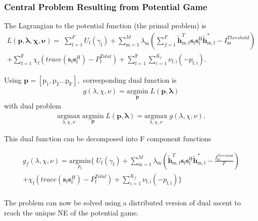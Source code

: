 \documentclass[12pt,a4paper]{report}
\begin{document}
\subsubsection{Central Problem Resulting from Potential Game}
The Lagrangian to the potential function (the primal problem) is
\begin{multline}
L(\mathbf{\mathbf{p},\lambda,\chi,\nu}) = 
\;
\sum_{\text{f}=1}^F U_{\text{f}}(\gamma_{\text{f}}) 
+
\sum_{\mathrm{m=1}}^M \lambda_{\mathrm{m}}
(	  \sum^F_{f=1} \mathbf{\tilde{h}}_{\mathrm{m,f}}^T  \mathbf{s}_{\mathrm{f}} 						
	\mathbf{s_{\mathrm{f}}^{\mathrm{H}}} \mathbf{\tilde{h}_{\mathrm{m,f}}^*} - I^{Threshold}		
	_{\mathrm{m}} )
\\
+ 
\sum_{\text{f}=1}^\text{F}
\chi_{\mathrm{f}}(trace(\mathbf{s}_\mathrm{f}\mathbf{s}_\mathrm{f}^H)-P^{Total}_{\text{f}} )
+
\sum_{\text{f}=1}^\text{F}
\sum_{i=1}^{K_{\text{f}}}
\nu_{\mathrm{f,i}}(-p_{\mathrm{f,i}}).
\end{multline}

Using $\mathbf{p}= [\mathrm{p}_1, \mathrm{p}_2...\mathrm{p}_{\text{F}}],$ corresponding dual function is
\begin{gather*}
g(\lambda, \chi, \nu) = \underset{\mathbf{p}}{\mathrm{argmin}}\;L(\mathbf{\mathbf{p},\lambda})
\end{gather*}
with dual problem 
\begin{gather*}
\underset{\lambda, \chi, \nu}{\mathrm{argmax}}\;\underset{\mathbf{p}}{\mathrm{argmin}}\;L(\mathbf{\mathbf{p},\lambda}) = \underset{\lambda, \chi, \nu}{\mathrm{argmax}}\;g(\lambda, \chi, \nu).
\end{gather*}

This dual function can be decomposed into F component functions


\begin{multline}
g_f(\lambda, \chi, \nu) = \underset{p_{\text{f}}}{\mathrm{argmin}}
\{
\;
U_{\text{f}}(\gamma_{\text{f}}) 
+
\sum_{\mathrm{m=1}}^M \lambda_{\mathrm{m}}
(\mathbf{\tilde{h}}_{\mathrm{m,f}}^T  \mathbf{s}_{\mathrm{f}} 						
	\mathbf{s_{\mathrm{f}}^{\mathrm{H}}} \mathbf{\tilde{h}_{\mathrm{m,f}}^*} - \frac{I^{Threshold}_{\mathrm{m}}}{F})
\\
+ 
\chi_{\mathrm{f}}(trace(\mathbf{s}_\mathrm{f}\mathbf{s}_\mathrm{f}^H)-P^{Total}_{\text{f}} )
+
\sum_{i=1}^{K_f}
\nu_{\mathrm{f,i}}(-p_{\mathrm{f,i}})\}
\end{multline}
\\

The problem can now be solved using a distributed version of dual ascent to reach the unique NE of the potential game. 
\end{document}
